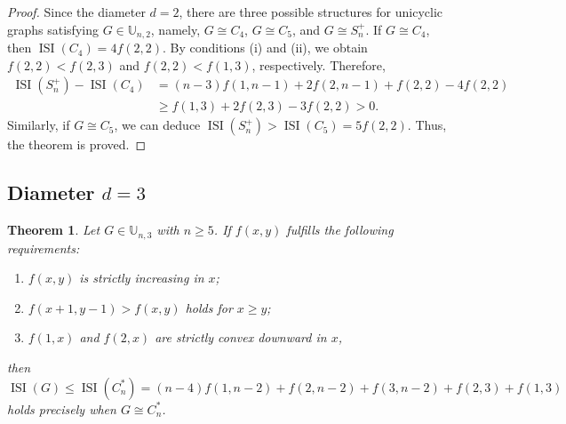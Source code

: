 \documentclass[12pt]{article}
\newtheorem{theorem}{Theorem}[section]
\theoremstyle{definition}
\newcommand{\ISI}{\operatorname{ISI}}
\newcommand{\UU}{\mathbb{U}}
\begin{document}
\begin{proof}
Since the diameter \(d = 2\), there are three possible structures for unicyclic graphs satisfying \(G \in \UU_{n,2}\), namely, \(G \cong C_4\), \(G \cong C_5\), and \(G \cong S_n^+\). If \(G \cong C_4\), then \(\ISI(C_4) = 4f(2,2)\). By conditions (i) and (ii), we obtain \(f(2,2) < f(2,3)\) and \(f(2,2) < f(1,3)\), respectively. Therefore,
\begin{align*}
\ISI(S_n^+) - \ISI(C_4) &= (n-3)f(1,n-1) + 2f(2,n-1) + f(2,2) - 4f(2,2) \\
&\geq f(1,3) + 2f(2,3) - 3f(2,2) > 0.
\end{align*}
Similarly, if \(G \cong C_5\), we can deduce \(\ISI(S_n^+) > \ISI(C_5) = 5f(2,2)\). Thus, the theorem is proved.
\end{proof}

\subsection{Diameter \(d = 3\)}

\begin{theorem}
\label{thm:unicyclic_d3}
Let \(G \in \UU_{n,3}\) with \(n \geq 5\). If \(f(x,y)\) fulfills the following requirements:
\begin{enumerate}[label=(\roman*)]
\item \(f(x,y)\) is strictly increasing in \(x\);
\item \(f(x+1,y-1) > f(x,y)\) holds for \(x \geq y\);
\item \(f(1,x)\) and \(f(2,x)\) are strictly convex downward in \(x\),
\end{enumerate}
then
\begin{equation}
\ISI(G) \leq \ISI(C_n^*) = (n-4)f(1,n-2) + f(2,n-2) + f(3,n-2) + f(2,3) + f(1,3)
\end{equation}
holds precisely when \(G \cong C_n^*\).
\end{theorem}
\end{document}
